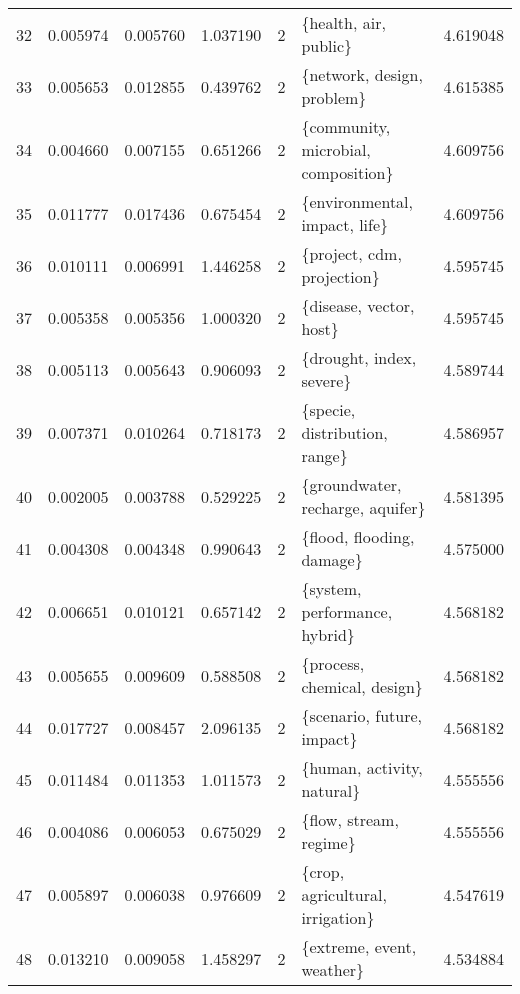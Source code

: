 \begin{tabular}{lrrrrlr}
32  &    0.005974 &  0.005760 &        1.037190 &           2 &                   \{health, air, public\} &  4.619048 \\
33  &    0.005653 &  0.012855 &        0.439762 &           2 &              \{network, design, problem\} &  4.615385 \\
34  &    0.004660 &  0.007155 &        0.651266 &           2 &     \{community, microbial, composition\} &  4.609756 \\
35  &    0.011777 &  0.017436 &        0.675454 &           2 &           \{environmental, impact, life\} &  4.609756 \\
36  &    0.010111 &  0.006991 &        1.446258 &           2 &              \{project, cdm, projection\} &  4.595745 \\
37  &    0.005358 &  0.005356 &        1.000320 &           2 &                 \{disease, vector, host\} &  4.595745 \\
38  &    0.005113 &  0.005643 &        0.906093 &           2 &                \{drought, index, severe\} &  4.589744 \\
39  &    0.007371 &  0.010264 &        0.718173 &           2 &           \{specie, distribution, range\} &  4.586957 \\
40  &    0.002005 &  0.003788 &        0.529225 &           2 &        \{groundwater, recharge, aquifer\} &  4.581395 \\
41  &    0.004308 &  0.004348 &        0.990643 &           2 &               \{flood, flooding, damage\} &  4.575000 \\
42  &    0.006651 &  0.010121 &        0.657142 &           2 &           \{system, performance, hybrid\} &  4.568182 \\
43  &    0.005655 &  0.009609 &        0.588508 &           2 &             \{process, chemical, design\} &  4.568182 \\
44  &    0.017727 &  0.008457 &        2.096135 &           2 &              \{scenario, future, impact\} &  4.568182 \\
45  &    0.011484 &  0.011353 &        1.011573 &           2 &              \{human, activity, natural\} &  4.555556 \\
46  &    0.004086 &  0.006053 &        0.675029 &           2 &                  \{flow, stream, regime\} &  4.555556 \\
47  &    0.005897 &  0.006038 &        0.976609 &           2 &        \{crop, agricultural, irrigation\} &  4.547619 \\
48  &    0.013210 &  0.009058 &        1.458297 &           2 &               \{extreme, event, weather\} &  4.534884 \\

\end{tabular}
